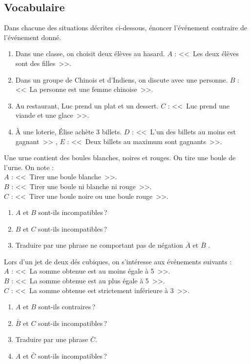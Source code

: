 \subsection*{Vocabulaire}
\begin{exo}
Dans chacune des situations décrites ci-dessous, énoncer l’événement contraire de l’événement donné.
\begin{enumerate}
\item Dans une classe, on choisit deux élèves au hasard. $A$ : <<~Les deux élèves sont des filles~>>.
\item Dans un groupe de Chinois et d'Indiens, on discute avec une personne. $B$ : <<~La personne est une femme chinoise~>>.
\item Au restaurant, Luc prend un plat et un dessert. $C$ : <<~Luc prend une viande et une glace~>>.
\item À une loterie, Élise achète 3 billets.
      $D$ : <<~L’un des billets au moins est gagnant~>> , $E$ : <<~Deux billets au maximum sont gagnants~>>.
\end{enumerate}
\end{exo}
%
\begin{exo}
Une urne contient des boules blanches, noires et rouges. On tire une boule de l’urne. On note : \\
$A$ : <<~Tirer une boule blanche~>>.                  \\
$B$ : <<~Tirer une boule ni blanche ni rouge~>>.      \\
$C$ : <<~Tirer une boule noire ou une boule rouge~>>. 
\begin{enumerate}
\item $A$ et $B$ sont-ils incompatibles\,?
\item $B$ et $C$ sont-ils incompatibles\,?
\item Traduire par une phrase ne comportant pas de négation $\bar{A}$ et $\bar{B}$ .
\end{enumerate}
\end{exo}
%
\begin{exo}
Lors d’un jet de deux dés cubiques, on s’intéresse aux événements suivants : \\
$A$ : <<~La somme obtenue est au moins égale à 5~>>.                  \\
$B$ : <<~La somme obtenue est au plus égale à 5~>>.                   \\
$C$ : <<~La somme obtenue est strictement inférieure à 3~>>. 
\begin{enumerate}
\item $A$ et $B$ sont-ils contraires\,?
\item $\bar{B}$ et $C$ sont-ils incompatibles\,?
\item Traduire par une phrase $\bar{C}$.
\item $A$ et $\bar{C}$ sont-ils incompatibles\,?
\end{enumerate}
\end{exo}
%
